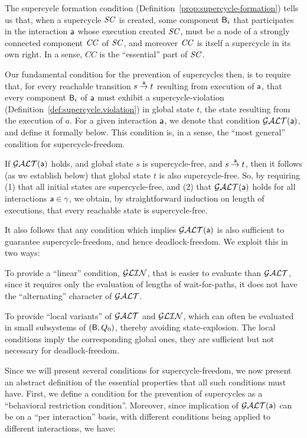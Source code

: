 
The supercycle formation condition (Definition~\ref{prop:supercycle-formation}) tells us that, when a supercycle $\SC$ is
created, some component $\B_i$ that participates in the interaction $\act$ whose execution created $\SC$, must be a node
of a strongly connected component $\CC$ of $\SC$, and moreover $\CC$ is itself a supercycle in its own right. In a sense,
$CC$ is the ``essential'' part of $\SC$.

Our fundamental condition for the prevention of supercycles then, is to require
that, for every reachable transition  $s \goesto[\act] t$ resulting from execution of $\act$, 
that every component $\B_i$ of $\act$
must exhibit a supercycle-violation (Definition~\ref{def:supercycle.violation}) in global state $t$, \ie the state resulting
from the execution of $a$. For a given interaction $\act$, we denote that condition $\GAO(\act)$, and define it formally below.
This condition is, in a sense, the ``most general'' condition for supercycle-freedom.

If $\GAO(\act)$ holds, and global state
$s$ is supercycle-free, and $s \goesto[\act] t$, then it follows (as
we establish below) that global state $t$ is also supercycle-free. 
So, by requiring (1) that all initial states are supercycle-free, and
(2) that $\GAO(\act)$ holds for all interactions $\act \in \gamma$, we
obtain, by straightforward induction on length of executions, that every reachable state is supercycle-free.

It also follows that any condition which implies $\GAO(\act)$ is also sufficient to guarantee  supercycle-freedom, and
hence deadlock-freedom. We exploit this in two ways:
\bn

\item To provide a ``linear'' condition, $\GLin$, that is easier to evaluate than $\GAO$, since it requires only the
evaluation of lengths of wait-for-paths, \ie it does not have the ``alternating'' character of $\GAO$. 

\item To provide ``local variants'' of $\GAO$ and $\GLin$,  which can often be
evaluated in small subsystems of $(\B, Q_0)$, thereby avoiding state-explosion. The local conditions imply the
corresponding global ones, \ie they are sufficient but not necessary for deadlock-freedom.

\en

Since we will present several conditions for supercycle-freedom, we now present an abstract definition of the essential
properties that all such conditions must have. First, we define a condition for the prevention of supercycles as a 
``behavioral restriction condition''. Moreover, since implication of $\GAO(\act)$ can be on a ``per interaction'' basis,
with different conditions being applied to different interactions, we have:



